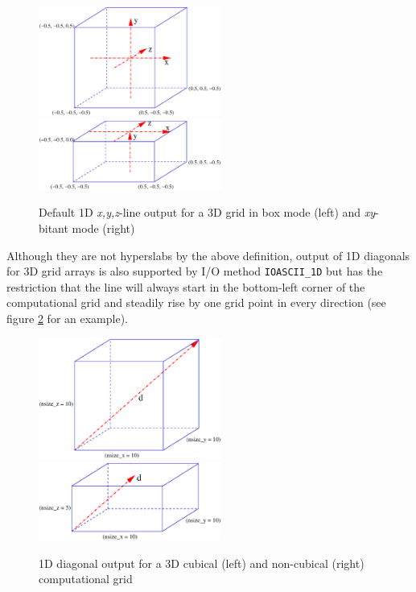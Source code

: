 \documentclass{article}
\begin{document}
\begin{figure}[ht]
\begin{center}
\includegraphics[width=6cm]{1Dlines_in_box.eps}
\includegraphics[width=6cm]{1Dlines_in_xyBitant.eps}
\end{center}
\caption{Default 1D {\it x,y,z}-line output for a 3D grid in box mode (left) and {\it xy}-bitant mode (right)}
\label{default_1D_output}
\end{figure}

Although they are not hyperslabs by the above definition, output of 1D
diagonals for 3D grid arrays is also supported by I/O method {\tt IOASCII\_1D}
but has the restriction that the line will always start in the bottom-left
corner of the computational grid and steadily rise by one grid point in
every direction (see figure \ref{default_diagonal_output} for an example).

\begin{figure}[ht]
\begin{center}
\includegraphics[width=6cm]{diagonal_in_cubic.eps}
\includegraphics[width=6cm]{diagonal_in_noncubic.eps}
\end{center}
\caption{1D diagonal output for a 3D cubical (left) and non-cubical (right)
computational grid}
\label{default_diagonal_output}
\end{figure}
\end{document}

